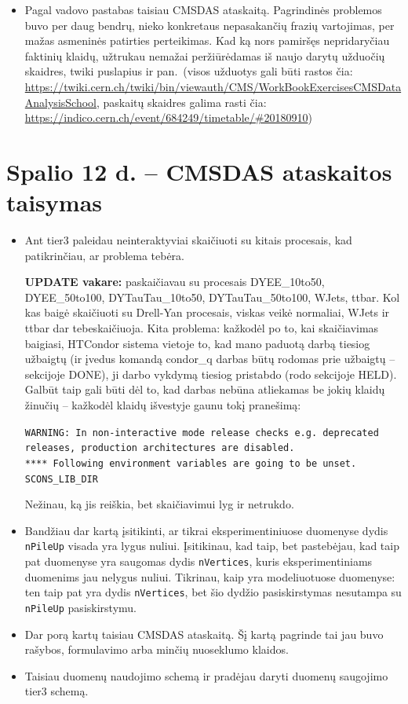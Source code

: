 \documentclass[a4paper, 12pt]{article}
\newcommand{\ttt}[1]{\texttt{#1}}
\begin{document}
\begin{itemize}
{	kodus, kad viskas būtų įskaitoma kaip reikia (tam taip pat ko gero reikės
	sutikrinti, ar korekcijų skaičiavimuose naudojamos failų versijos yra tinkamos)}.
	\item Pagal vadovo pastabas taisiau CMSDAS ataskaitą. Pagrindinės problemos buvo
	per daug bendrų, nieko konkretaus nepasakančių frazių vartojimas, per mažas
	asmeninės patirties perteikimas. Kad ką nors pamiršęs nepridaryčiau faktinių
	klaidų, užtrukau nemažai peržiūrėdamas iš naujo darytų užduočių skaidres,
	twiki puslapius ir pan.\ (visos užduotys gali būti rastos čia:
	\url{https://twiki.cern.ch/twiki/bin/viewauth/CMS/WorkBookExercisesCMSDataAnalysisSchool},
	paskaitų skaidres galima rasti čia: \url{https://indico.cern.ch/event/684249/timetable/#20180910})
\end{itemize}

\section{Spalio 12 d. -- CMSDAS ataskaitos taisymas}

\begin{itemize}
	\item Ant tier3 paleidau neinteraktyviai skaičiuoti su kitais procesais,
	kad patikrinčiau, ar problema tebėra.
	
	\textbf{UPDATE vakare:} paskaičiavau su procesais DYEE\_10to50, DYEE\_50to100,
	DYTauTau\_10to50, DYTauTau\_50to100, WJets, ttbar. Kol kas baigė skaičiuoti su
	Drell-Yan procesais, viskas veikė normaliai, WJets ir ttbar dar tebeskaičiuoja.
	Kita problema: kažkodėl po to, kai skaičiavimas baigiasi, HTCondor sistema vietoje
	to, kad mano paduotą darbą tiesiog užbaigtų (ir įvedus komandą condor\_q
	darbas būtų rodomas prie užbaigtų -- sekcijoje DONE), ji darbo vykdymą
	tiesiog pristabdo (rodo sekcijoje HELD). Galbūt taip gali būti dėl to,
	kad darbas nebūna atliekamas be jokių klaidų žinučių -- kažkodėl klaidų išvestyje
	gaunu tokį pranešimą:
	
	\ttt{WARNING: In non-interactive mode release checks e.g. deprecated releases,
	production architectures are disabled.\\
	**** Following environment variables are going to be unset.\\ SCONS\_LIB\_DIR}
	
	Nežinau, ką jis reiškia, bet skaičiavimui lyg ir netrukdo.
	\item Bandžiau dar kartą įsitikinti, ar tikrai eksperimentiniuose duomenyse
	dydis \ttt{nPileUp} visada yra lygus nuliui. Įsitikinau, kad taip, bet pastebėjau,
	kad taip pat duomenyse yra saugomas dydis \ttt{nVertices}, kuris eksperimentiniams
	duomenims jau nelygus nuliui. Tikrinau, kaip yra modeliuotuose duomenyse: ten taip
	pat yra dydis \ttt{nVertices}, bet šio dydžio pasiskirstymas nesutampa su
	\ttt{nPileUp} pasiskirstymu.
	\item Dar  porą kartų taisiau CMSDAS ataskaitą. Šį kartą pagrinde tai jau buvo rašybos, formulavimo
	arba minčių nuoseklumo klaidos.
	\item Taisiau duomenų naudojimo schemą ir pradėjau daryti duomenų saugojimo tier3 schemą.
\end{itemize}
\end{document}
